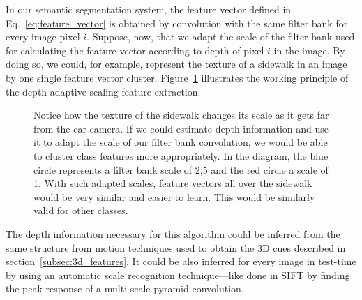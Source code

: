 In our semantic segmentation system, the feature vector defined in Eq.~\ref{eq:feature_vector} is obtained by convolution with the same filter bank for every image pixel $i$. Suppose, now, that we adapt the scale of the filter bank used for calculating the feature vector according to depth of pixel $i$ in the image. By doing so, we could, for example, represent the texture of a sidewalk in an image by one single feature vector cluster. Figure~\ref{fig:depth_adaptive_scaling} illustrates the working principle of the depth-adaptive scaling feature extraction. 

\begin{figure}[htb]
\caption[Adaptive scaling]{Notice how the texture of the sidewalk changes its scale as it gets far from the car camera. If we could estimate depth information and use it to adapt the scale of our filter bank convolution, we would be able to cluster class features more appropriately. In the diagram, the blue circle represents a filter bank scale of 2,5 and the red circle a scale of 1. With such adapted scales, feature vectors all over the sidewalk would be very similar and easier to learn. This would be similarly valid for other classes.}
\label{fig:depth_adaptive_scaling}
\end{figure}

The depth information necessary for this algorithm could be inferred from the same structure from motion techniques used to obtain the 3D cues described in section~\ref{subsec:3d_features}. It could be also inferred for every image in test-time by using an automatic scale recognition technique---like done in SIFT by finding the peak response of a multi-scale pyramid convolution. 


